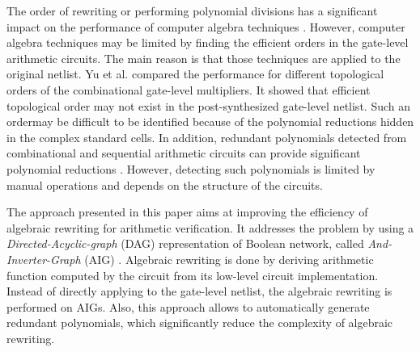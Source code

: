 The order of rewriting or performing polynomial divisions has a significant impact on the performance of computer algebra techniques \cite{sayedformal:date-2016}\cite{yu:2016-tcad-verification}. However, computer algebra techniques may be limited by finding the efficient orders in the gate-level arithmetic circuits. The main reason is that those techniques are applied to the original netlist. Yu et al. \cite{yu:2016-tcad-verification} compared the performance for different topological orders of the combinational gate-level multipliers. It showed that efficient topological order may not exist in the post-synthesized gate-level netlist. Such an ordermay be difficult to be identified because of the polynomial reductions hidden in the complex standard cells. In addition, redundant polynomials detected from combinational and sequential arithmetic circuits can provide significant polynomial reductions \cite{yu-isvlsi-16a}. However, detecting such polynomials is limited by manual operations and depends on the structure of the circuits.

The approach presented in this paper aims at improving the efficiency of algebraic rewriting for arithmetic verification. It addresses the problem by using a \textit{Directed-Acyclic-graph} (DAG) representation of Boolean network, called \textit{And-Inverter-Graph} (AIG) \cite{mishchenko:2006-dag}. Algebraic rewriting is done by deriving arithmetic function computed by the circuit from its low-level circuit implementation. Instead of directly applying to the gate-level netlist, the algebraic rewriting is performed on AIGs. Also, this approach allows to automatically generate redundant polynomials, which significantly reduce the complexity of algebraic rewriting. 





